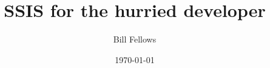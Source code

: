 \documentclass[a4paper,12pt]{book}
\begin{document}
% 

\lstset{upquote=true}

\author{Bill Fellows}
\title{SSIS for the hurried developer}
\date{\today}

\frontmatter
\maketitle
\tableofcontents

\mainmatter







%
%


\backmatter
\end{document}
